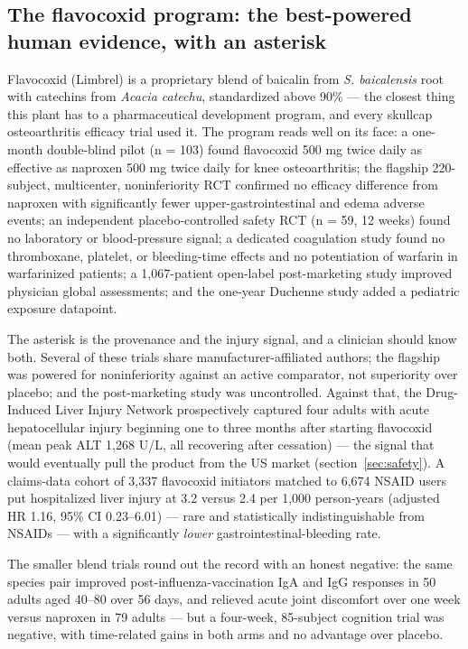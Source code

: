 \subsection{The flavocoxid program: the best-powered human evidence, with an asterisk}

Flavocoxid (Limbrel) is a proprietary blend of baicalin from \textit{S. baicalensis} root with catechins from \textit{Acacia catechu}, standardized above 90\% --- the closest thing this plant has to a pharmaceutical development program, and every skullcap osteoarthritis efficacy trial used it. The program reads well on its face: a one-month double-blind pilot (n = 103) found flavocoxid 500 mg twice daily as effective as naproxen 500 mg twice daily for knee osteoarthritis; the flagship 220-subject, multicenter, noninferiority RCT confirmed no efficacy difference from naproxen with significantly fewer upper-gastrointestinal and edema adverse events; an independent placebo-controlled safety RCT (n = 59, 12 weeks) found no laboratory or blood-pressure signal; a dedicated coagulation study found no thromboxane, platelet, or bleeding-time effects and no potentiation of warfarin in warfarinized patients; a 1{,}067-patient open-label post-marketing study improved physician global assessments; and the one-year Duchenne study added a pediatric exposure datapoint.

The asterisk is the provenance and the injury signal, and a clinician should know both. Several of these trials share manufacturer-affiliated authors; the flagship was powered for noninferiority against an active comparator, not superiority over placebo; and the post-marketing study was uncontrolled. Against that, the Drug-Induced Liver Injury Network prospectively captured four adults with acute hepatocellular injury beginning one to three months after starting flavocoxid (mean peak ALT 1{,}268 U/L, all recovering after cessation) --- the signal that would eventually pull the product from the US market (section~\ref{sec:safety}). A claims-data cohort of 3{,}337 flavocoxid initiators matched to 6{,}674 NSAID users put hospitalized liver injury at 3.2 versus 2.4 per 1{,}000 person-years (adjusted HR 1.16, 95\% CI 0.23--6.01) --- rare and statistically indistinguishable from NSAIDs --- with a significantly \emph{lower} gastrointestinal-bleeding rate.

The smaller blend trials round out the record with an honest negative: the same species pair improved post-influenza-vaccination IgA and IgG responses in 50 adults aged 40--80 over 56 days, and relieved acute joint discomfort over one week versus naproxen in 79 adults --- but a four-week, 85-subject cognition trial was negative, with time-related gains in both arms and no advantage over placebo.


